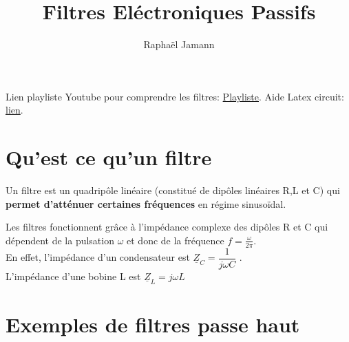 \documentclass{article}
\title{Filtres Eléctroniques Passifs}
\author{Raphaël Jamann}
\date{} %
\begin{document}
    \maketitle

    Lien playliste Youtube pour comprendre les filtres: \href{https://youtube.com/playlist?list=PLBRwdavN8jtvGuPq0_vqaGfYz1iMiCGmt&si=m3tA0icXFmadQLan}{Playliste}.
    Aide Latex circuit: \href{https://nboulaire.developpez.com/tutoriels/latex/circuitikz_base/}{lien}.

    \section{Qu'est ce qu'un filtre}
    
    Un filtre est un quadripôle linéaire (constitué de dipôles linéaires R,L et C) qui \textbf{permet
    d'atténuer certaines fréquences} en régime sinusoïdal. 

    \bigskip
    Les filtres fonctionnent grâce à l'impédance complexe des dipôles R et C qui dépendent
    de la pulsation $\omega$ et donc de la fréquence $f=\frac{\omega}{2\pi}$. \\
    En effet, l'impédance d'un condensateur est $\underline{Z}_C=\dfrac{1}{j\omega C}$ . \\
    L'impédance d'une bobine L est $\underline{Z}_L=j\omega L$


    \section{Exemples de filtres passe haut}
\end{document}
